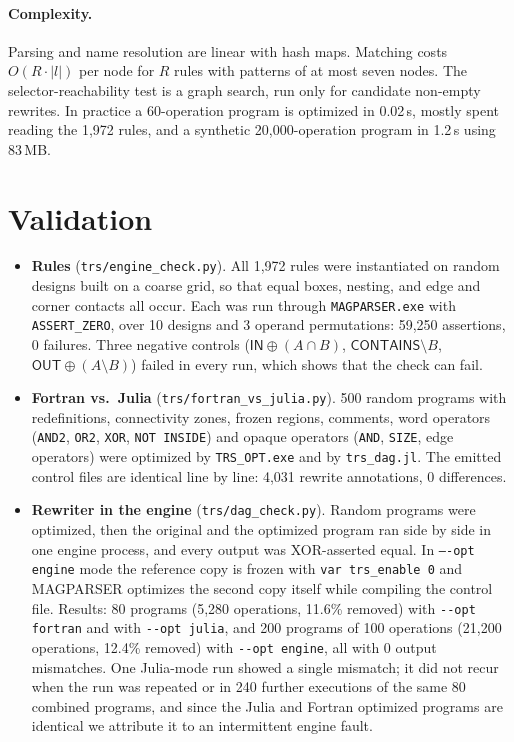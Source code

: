 \documentclass[11pt]{article}
\newcommand{\op}[1]{\texttt{#1}}
\newcommand{\sel}[1]{\ensuremath{\mathsf{#1}}}
\begin{document}
\paragraph{Complexity.} Parsing and name resolution are linear with hash maps. Matching costs $O(R\cdot|l|)$ per node for $R$ rules with patterns of at most seven nodes. The selector-reachability test is a graph search, run only for candidate non-empty rewrites. In practice a 60-operation program is optimized in 0.02\,s, mostly spent reading the 1{,}972 rules, and a synthetic 20{,}000-operation program in 1.2\,s using 83\,MB.

\section{Validation}\label{sec:val}
\begin{itemize}
\item \textbf{Rules} (\texttt{trs/engine\_check.py}). All 1{,}972 rules were instantiated on random designs built on a coarse grid, so that equal boxes, nesting, and edge and corner contacts all occur. Each was run through \texttt{MAGPARSER.exe} with \op{ASSERT\_ZERO}, over 10 designs and 3 operand permutations: 59{,}250 assertions, 0 failures. Three negative controls ($\sel{IN}\oplus(A\cap B)$, $\sel{CONTAINS}\setminus B$, $\sel{OUT}\oplus(A\setminus B)$) failed in every run, which shows that the check can fail.
\item \textbf{Fortran vs.\ Julia} (\texttt{trs/fortran\_vs\_julia.py}). 500 random programs with redefinitions, connectivity zones, frozen regions, comments, word operators (\op{AND2}, \op{OR2}, \op{XOR}, \op{NOT INSIDE}) and opaque operators (\op{AND}, \op{SIZE}, edge operators) were optimized by \texttt{TRS\_OPT.exe} and by \texttt{trs\_dag.jl}. The emitted control files are identical line by line: 4{,}031 rewrite annotations, 0 differences.
\item \textbf{Rewriter in the engine} (\texttt{trs/dag\_check.py}). Random programs were optimized, then the original and the optimized program ran side by side in one engine process, and every output was XOR-asserted equal. In \texttt{--{}-opt engine} mode the reference copy is frozen with \texttt{var trs\_enable 0} and MAGPARSER optimizes the second copy itself while compiling the control file. Results: 80 programs (5{,}280 operations, 11.6\% removed) with \texttt{-{}-opt fortran} and with \texttt{-{}-opt julia}, and 200 programs of 100 operations (21{,}200 operations, 12.4\% removed) with \texttt{-{}-opt engine}, all with 0 output mismatches. One Julia-mode run showed a single mismatch; it did not recur when the run was repeated or in 240 further executions of the same 80 combined programs, and since the Julia and Fortran optimized programs are identical we attribute it to an intermittent engine fault.
\end{itemize}
\end{document}
